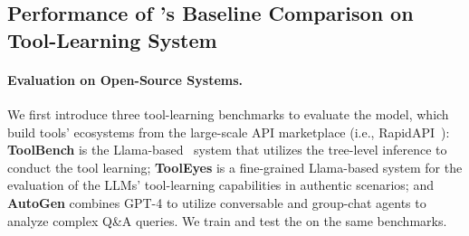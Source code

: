 










\subsection{Performance of {\tool}'s Baseline Comparison on Tool-Learning System}



\paragraph{Evaluation {on Open-Source Systems}.}
We first introduce three tool-learning benchmarks to evaluate the model, which build tools' ecosystems from the large-scale API marketplace (i.e., RapidAPI~\cite{DBLP:conf/ccs/Liao0LSCYH24}):
\textbf{ToolBench} is the Llama-based~\cite{DBLP:journals/corr/abs-2302-13971} system that utilizes the tree-level inference to conduct the tool learning; 
\textbf{ToolEyes} is a fine-grained
Llama-based system for the evaluation of the LLMs' tool-learning capabilities in authentic scenarios;
and \textbf{AutoGen} combines GPT-4 to utilize conversable and group-chat agents to analyze complex Q\&A queries.
We train and test the {\tool} on the same benchmarks.


